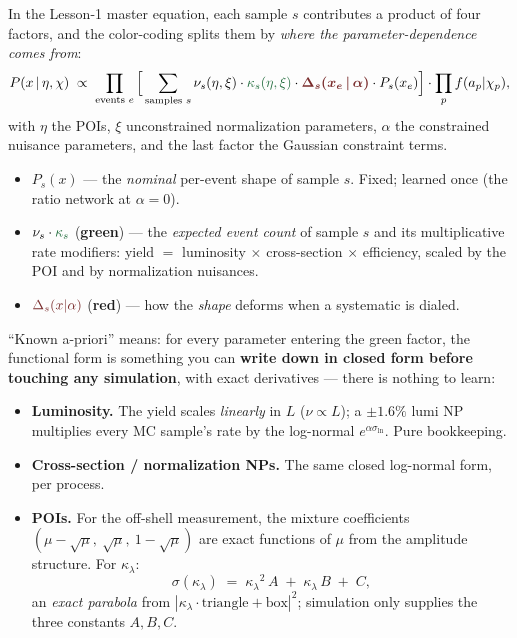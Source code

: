 \documentclass[11pt]{article}
\newcommand{\kl}{\ensuremath{\kappa_\lambda}}
\begin{document}
In the Lesson-1 master equation, each sample $s$ contributes a product of four factors, and the color-coding
splits them by \emph{where the parameter-dependence comes from}:
\begin{equation}
P(x\,|\,\eta,\chi)\;\propto\;\prod_{\text{events }e}\Big[\sum_{\text{samples }s}
\nu_s(\eta,\xi)\cdot{\color{known}\kappa_s(\eta,\xi)}\cdot
{\color{accent}\boldsymbol{\Delta_s(x_e\,|\,\alpha)}}\cdot P_s(x_e)\Big]\cdot\prod_p f(a_p|\chi_p),
\end{equation}
with $\eta$ the POIs, $\xi$ unconstrained normalization parameters, $\alpha$ the constrained nuisance
parameters, and the last factor the Gaussian constraint terms.
\begin{itemize}
\item $P_s(x)$ --- the \emph{nominal} per-event shape of sample $s$. Fixed; learned once (the ratio network at
  $\alpha=0$).
\item $\nu_s\cdot{\color{known}\kappa_s}$ (\textcolor{known}{\textbf{green}}) --- the \emph{expected event
  count} of sample $s$ and its multiplicative rate modifiers: yield $=$ luminosity $\times$ cross-section
  $\times$ efficiency, scaled by the POI and by normalization nuisances.
\item ${\color{accent}\Delta_s(x|\alpha)}$ (\textcolor{accent}{\textbf{red}}) --- how the \emph{shape} deforms
  when a systematic is dialed.
\end{itemize}

\noindent``Known a-priori'' means: for every parameter entering the green factor, the functional form is
something you can \textbf{write down in closed form before touching any simulation}, with exact derivatives ---
there is nothing to learn:
\begin{itemize}
\item \textbf{Luminosity.} The yield scales \emph{linearly} in $L$ ($\nu\propto L$); a $\pm1.6\%$ lumi NP
  multiplies every MC sample's rate by the log-normal $e^{\alpha\sigma_{\ln}}$. Pure bookkeeping.
\item \textbf{Cross-section / normalization NPs.} The same closed log-normal form, per process.
\item \textbf{POIs.} For the off-shell measurement, the mixture coefficients
  $(\mu-\sqrt\mu,\ \sqrt\mu,\ 1-\sqrt\mu)$ are exact functions of $\mu$ from the amplitude structure. For \kl:
\begin{equation}
\sigma(\kl)\;=\;\kl^2\,A\;+\;\kl\,B\;+\;C,
\end{equation}
  an \emph{exact parabola} from $|\kl\cdot\text{triangle}+\text{box}|^2$; simulation only supplies the three
  constants $A,B,C$.
\end{itemize}
\end{document}
